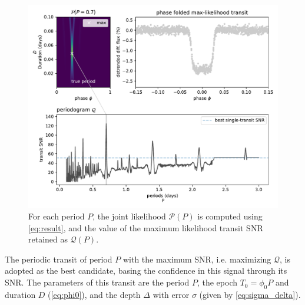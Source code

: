 \documentclass[modern]{aastex631}
\begin{document}
\begin{figure}[H]
    \begin{centering}
        \includegraphics[width=\linewidth]{../workflows/principle/figures/principle_Q.pdf}
        \caption{For each period $P$, the joint likelihood $\mathcal{P}(P)$ is computed using \autoref{eq:result}, and the value of the maximum likelihood transit SNR retained as $\mathcal{Q}(P)$.}
        \label{fig:periodogram}
    \end{centering}
\end{figure}
The periodic transit of period $P$ with the maximum SNR, i.e. maximizing $\mathcal{Q}$, is adopted as the best candidate, basing the confidence in this signal through its SNR. The parameters of this transit are the period $P$, the epoch $T_0 = \phi_0 P$ and duration $D$ (\autoref{eq:phi0}), and the depth $\Delta$ with error $\sigma$ (given by \autoref{eq:sigma_delta}).
\end{document}
